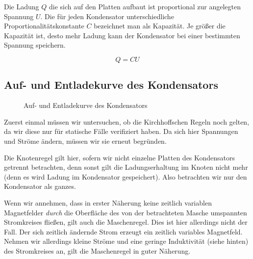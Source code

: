 \documentclass[a4paper,german,12pt,smallheadings]{scrartcl}
\begin{document}
Die Ladung $Q$ die sich auf den Platten aufbaut ist proportional zur angelegten
Spannung $U$. Die für jeden Kondensator unterschiedliche
Proportionalitätskonstante $C$ bezeichnet man als Kapazität. Je größer die
Kapazität ist, desto mehr Ladung kann der Kondensator bei einer bestimmten
Spannung speichern.


\begin{equation}
  Q = C U
  \label{eq:capa}
\end{equation}

\subsection{Auf- und Entladekurve des Kondensators}

\begin{figure}[H]
  \begin{center}
    \caption{Auf- und Entladekurve des Kondensators}
  \end{center}
\end{figure}


Zuerst einmal müssen wir untersuchen, ob die Kirchhoffschen Regeln noch gelten,
da wir diese nur für statische Fälle verifiziert haben. Da sich hier Spannungen
und Ströme ändern, müssen wir sie erneut begründen.

Die Knotenregel gilt hier, sofern wir nicht einzelne Platten des Kondensators
getrennt betrachten, denn sonst gilt die Ladungserhaltung im Knoten nicht mehr
(denn es wird Ladung im Kondensator gespeichert). Also betrachten wir nur den
Kondensator als ganzes.

Wenn wir annehmen, dass in erster Näherung keine zeitlich variablen
Magnetfelder \textit{durch} die Oberfläche des von der betrachteten Masche
umspannten Stromkreises fließen, gilt auch die Maschenregel. Dies ist hier
allerdings nicht der Fall. Der sich zeitlich ändernde Strom erzeugt ein
zeitlich variables Magnetfeld. Nehmen wir allerdings kleine Ströme
und eine geringe Induktivität (siehe hinten) des Stromkreises an, gilt die
Maschenregel in guter Näherung.
\end{document}
